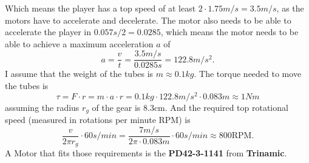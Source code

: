 \noindent Which means the player has a top speed of at least $2\cdot1.75m/s=3.5m/s$, as the motors have to accelerate and decelerate.
The motor also needs to be able to accelerate the player in $0.057s/2=0.0285$, which means the motor needs to be able to achieve a maximum acceleration $a$ of
\begin{equation}
    \label{eq:acceleration}
    a = \frac{v}{t} = \frac{3.5m/s}{0.0285s} = 122.8m/s^2.
\end{equation}
I assume that the weight of the tubes is $m \approx 0.1kg$.
The torque needed to move the tubes is
\begin{equation}
    \label{eq:torque}
    \tau = F \cdot r = m \cdot a \cdot r = 0.1kg \cdot 122.8m/s^2 \cdot 0.083m \approx 1Nm
\end{equation}
assuming the radius $r_g$ of the gear is 8.3cm.
And the required top rotational speed (measured in rotations per minute $\text{RPM}$) is
\begin{equation}
    \label{eq:top_rpm}
    \frac{v}{2\pi r_g} \cdot 60s/min = \frac{7m/s}{2\pi \cdot 0.083m} \cdot 60s/min \approx 800\text{RPM}.
\end{equation}
A Motor that fits those requirements is the \textbf{PD42-3-1141\autocite{PD42-3-1141}} from \textbf{Trinamic}.

